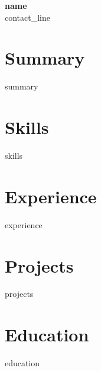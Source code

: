 \documentclass[10pt,a4paper]{article}
\begin{document}
\begin{center}
{\LARGE \textbf{{{ name }}}}\\
\vspace{2pt}
{{ contact_line }}
\end{center}
\section*{Summary}
{{ summary }}
\section*{Skills}
{{ skills }}
\section*{Experience}
{{ experience }}
\section*{Projects}
{{ projects }}
\section*{Education}
{{ education }}
\end{document}
